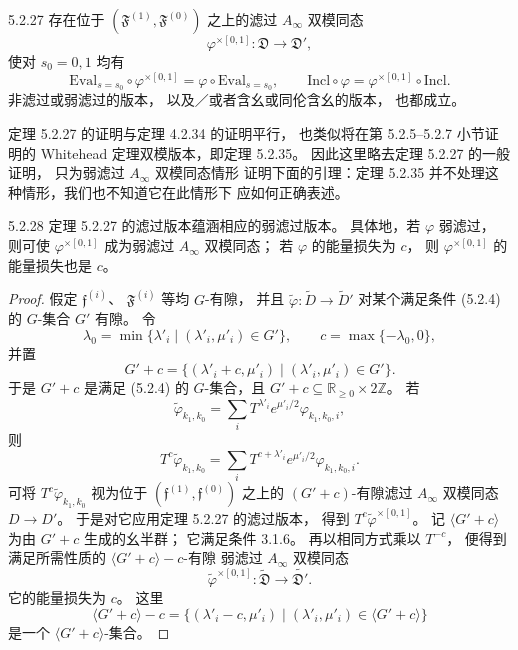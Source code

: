 \begin{theorem}{5.2.27}\label{thm:5-2-27}
存在位于
$(\mathfrak F^{(1)},\mathfrak F^{(0)})$
之上的滤过 $A_\infty$ 双模同态
\[
\varphi^{\times[0,1]}:\mathfrak D
\longrightarrow\mathfrak D',
\]
使对 $s_0=0,1$ 均有
\[
\mathrm{Eval}_{s=s_0}\circ
\varphi^{\times[0,1]}
=\varphi\circ\mathrm{Eval}_{s=s_0},
\qquad
\mathrm{Incl}\circ\varphi
=\varphi^{\times[0,1]}\circ\mathrm{Incl}.
\]
非滤过或弱滤过的版本，
以及／或者含幺或同伦含幺的版本，
也都成立。
\end{theorem}

定理 5.2.27 的证明与定理 4.2.34 的证明平行，
也类似将在第 5.2.5--5.2.7 小节证明的
Whitehead 定理双模版本，即定理 5.2.35。
因此这里略去定理 5.2.27 的一般证明，
只为弱滤过 $A_\infty$ 双模同态情形
证明下面的引理：定理 5.2.35
并不处理这种情形，我们也不知道它在此情形下
应如何正确表述。

\begin{lemma}{5.2.28}\label{lem:5-2-28}
定理 5.2.27 的滤过版本蕴涵相应的弱滤过版本。
具体地，若 $\varphi$ 弱滤过，
则可使 $\varphi^{\times[0,1]}$
成为弱滤过 $A_\infty$ 双模同态；
若 $\varphi$ 的能量损失为 $c$，
则 $\varphi^{\times[0,1]}$
的能量损失也是 $c$。
\end{lemma}

\begin{proof}
假定 $\mathfrak f^{(i)}$、
$\mathfrak F^{(i)}$ 等均 $G$-有隙，
并且 $\widetilde\varphi:
\widetilde D\to\widetilde D'$
对某个满足条件 (5.2.4) 的
$G$-集合 $G'$ 有隙。
令
\[
\lambda_0
=\min\{\lambda'_i\mid
(\lambda'_i,\mu'_i)\in G'\},
\qquad
c=\max\{-\lambda_0,0\},
\]
并置
\[
G'+c
=\{(\lambda'_i+c,\mu'_i)
\mid(\lambda'_i,\mu'_i)\in G'\}.
\]
于是 $G'+c$ 是满足 (5.2.4) 的
$G$-集合，且
$G'+c\subseteq\mathbb R_{\geq0}\times2\mathbb Z$。
若
\[
\widetilde\varphi_{k_1,k_0}
=\sum_i T^{\lambda'_i}e^{\mu'_i/2}
\varphi_{k_1,k_0,i},
\]
则
\[
T^c\widetilde\varphi_{k_1,k_0}
=\sum_i T^{c+\lambda'_i}e^{\mu'_i/2}
\varphi_{k_1,k_0,i}.
\]
可将 $T^c\widetilde\varphi_{k_1,k_0}$
视为位于
$(\mathfrak f^{(1)},\mathfrak f^{(0)})$
之上的 $(G'+c)$-有隙滤过
$A_\infty$ 双模同态 $D\to D'$。
于是对它应用定理 5.2.27 的滤过版本，
得到
$T^c\widetilde\varphi^{\times[0,1]}$。
记 $\langle G'+c\rangle$
为由 $G'+c$ 生成的幺半群；
它满足条件 3.1.6。
再以相同方式乘以 $T^{-c}$，
便得到满足所需性质的
$\langle G'+c\rangle-c$-有隙
弱滤过 $A_\infty$ 双模同态
\[
\widetilde\varphi^{\times[0,1]}:
\widetilde{\mathfrak D}
\longrightarrow\widetilde{\mathfrak D'}.
\]
它的能量损失为 $c$。
这里
\[
\langle G'+c\rangle-c
=\{(\lambda'_i-c,\mu'_i)\mid
(\lambda'_i,\mu'_i)\in\langle G'+c\rangle\}
\]
是一个 $\langle G'+c\rangle$-集合。
\end{proof}

